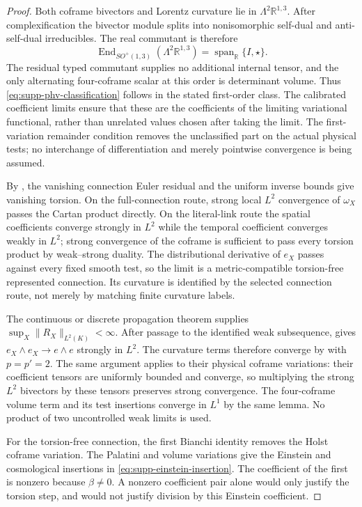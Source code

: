 \documentclass[11pt]{article}
\numberwithin{equation}{section}
\theoremstyle{definition}
\theoremstyle{remark}
\newcommand{\R}{\mathbb R}
\newcommand{\Span}{\operatorname{span}}
\begin{document}
\begin{proof}
Both coframe bivectors and Lorentz curvature lie in
$\Lambda^2\R^{1,3}$.  After complexification the bivector module splits into
nonisomorphic self-dual and anti-self-dual irreducibles.  The real commutant is
therefore
\begin{equation}
 \operatorname{End}_{SO^+(1,3)}(\Lambda^2\R^{1,3})
       =\Span_\R\{I,\star\}.
 \label{eq:supp-lorentz-commutant}
\end{equation}
The residual typed commutant supplies no additional internal tensor, and the
only alternating four-coframe scalar at this order is determinant volume.
Thus \eqref{eq:supp-phv-classification} follows in the stated first-order
class.  The calibrated coefficient limits ensure that these are the
coefficients of the limiting variational functional, rather than unrelated
values chosen after taking the limit. The first-variation remainder condition
removes the unclassified part on the actual physical tests; no interchange
of differentiation and merely pointwise convergence is being assumed.

By , the vanishing connection Euler residual
and the uniform inverse bounds give vanishing torsion.  On the full-connection
route, strong local $L^2$ convergence of $\omega_X$ passes the Cartan product
directly.  On the literal-link route the spatial coefficients converge
strongly in $L^2$ while the temporal coefficient converges weakly in $L^2$;
strong convergence of the coframe is sufficient to pass every torsion product
by weak--strong duality.  The distributional derivative of $e_X$ passes
against every fixed smooth test, so the limit is a metric-compatible
torsion-free represented connection.  Its curvature is identified by the
selected connection route, not merely by matching finite curvature labels.

The continuous or discrete propagation theorem supplies
$\sup_X\|R_X\|_{L^2(K)}<\infty$.  After passage to the identified weak
subsequence,  gives
$e_X\wedge e_X\to e\wedge e$ strongly in $L^2$.  The curvature terms
therefore converge by  with $p=p'=2$.
The same argument applies to their physical coframe variations: their
coefficient tensors are uniformly bounded and converge, so multiplying the
strong $L^2$ bivectors by these tensors preserves strong convergence.
The four-coframe volume term and its test insertions converge in $L^1$ by
the same lemma.  No product of two uncontrolled weak limits is used.

For the torsion-free connection, the first Bianchi identity removes the
Holst coframe variation.  The Palatini and volume variations give the
Einstein and cosmological insertions in
\eqref{eq:supp-einstein-insertion}.  The coefficient of the first is nonzero
because $\beta\ne0$.  A nonzero coefficient pair alone would only justify
the torsion step, and would not justify division by this Einstein coefficient.
\end{proof}
\end{document}
